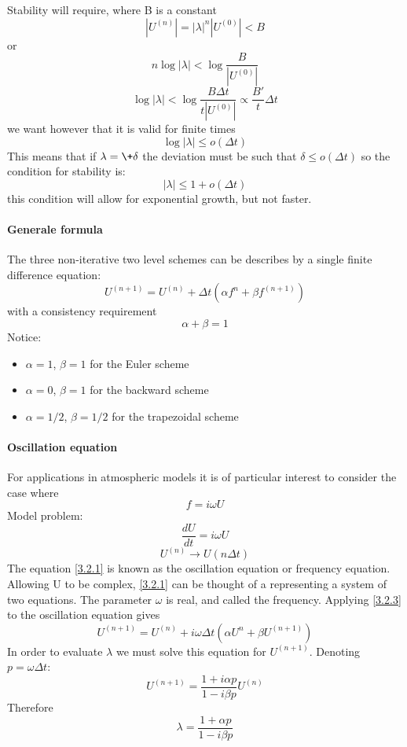 Stability will require, where B is a constant
\begin{equation}
    |U^{(n)}|=|\lambda|^n|U^{(0)}|<B
\end{equation}
or 
\begin{equation}
    n\log|\lambda|<\log\frac{B}{|U^{(0)}|}
\end{equation}
$$\log|\lambda|<\log\frac{B\Delta t}{t|U^{(0)}|}\propto \frac{B'}{t}\Delta t$$
we want however that it is valid for finite times
$$\log|\lambda|\leq o(\Delta t)$$
This means that if $\lambda=\+\delta$ the deviation must be such that $\delta\leq o(\Delta t)$ so the condition for stability is:
\begin{equation}
    |\lambda|\leq 1+o(\Delta t)
\end{equation}
this condition will allow for exponential growth, but not faster.
\paragraph{Generale formula}
The three non-iterative two level schemes can be describes by a single finite difference equation:
\begin{equation}\label{3.2.6}
    U^{(n+1)}=U^{(n)}+\Delta t\left(\alpha f^n+\beta f^{(n+1)}\right)
\end{equation}
with a consistency requirement
$$\alpha+\beta=1$$
Notice: 
\begin{itemize}
    \item $\alpha=1$, $\beta =1$ for the Euler scheme
    \item $\alpha=0$, $\beta=1$ for the backward scheme
    \item $\alpha=1/2$, $\beta=1/2$ for the trapezoidal scheme
\end{itemize}
\paragraph{Oscillation equation}
For applications in atmospheric models it is of particular interest to consider the case where $$f=i\omega U$$
Model problem:
\begin{equation}\label{3.2.1}
    \frac{dU}{dt}=i\omega U
\end{equation}
$$U^{(n)}\rightarrow U(n\Delta t)$$
The equation \ref{3.2.1} is known as the oscillation equation or frequency equation. Allowing U to be complex, \ref{3.2.1} can be thought of a representing a system of two equations. The parameter $\omega$ is real, and called the frequency. 
Applying \ref{3.2.3} to the oscillation equation gives
\begin{equation}
    U^{(n+1)}=U^{(n)}+i\omega\Delta t\left(\alpha U^n+\beta U^{(n+1)}\right)
\end{equation}
In order to evaluate $\lambda$ we must solve this equation for $U^{(n+1)}$. Denoting $p=\omega\Delta t$:
\begin{equation}\label{3.2.9}
    U^{(n+1)}=\frac{1+i\alpha p}{1-i\beta p}U^{(n)}
\end{equation}
Therefore 
\begin{equation}\label{3.2.10}
    \lambda=\frac{1+\alpha p}{1-i\beta p}
\end{equation}
